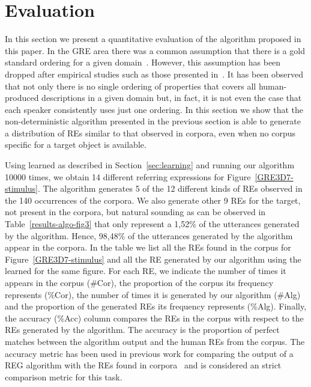 \section{Evaluation}\label{sec:evaluation}

In this section we present a quantitative evaluation of the algorithm proposed in this paper. In the GRE area there was a common assumption that there is a gold standard ordering for a given domain~\cite{Dale1995}. However, this assumption has been dropped after empirical studies such as those presented in~\cite{arec2:2008:Areces,viet:gene11}. It has been observed that not only there is no single ordering of properties that covers all human-produced descriptions in a given domain but, in fact, it is not even the case that each speaker consistently uses just one ordering. In this section we show that the non-deterministic algorithm presented in the previous section is able to generate a distribution of REs similar to that observed in corpora, even when no corpus specific for a target object is available. 

Using \puse learned as described in Section~\ref{sec:learning} and running our algorithm 10000 times, we obtain 14 different referring expressions for Figure~\ref{GRE3D7-stimulus}. The algorithm generates 5 of the 12 different kinds of REs observed in the 140 occurrences of the corpora. We also generate other 9 REs for the target, not present in the corpora, but natural sounding as can be observed in Table~\ref{results-algo-fig3} that only represent a 1,52\% of the utterances generated by the algorithm. Hence, 98,48\% of the utterances generated by the algorithm appear in the corpora. In the table we list all the REs found in the corpus for Figure~\ref{GRE3D7-stimulus} and all the RE generated by our algorithm using the learned \puse for the same figure. For each RE, we indicate the number of times it appears in the corpus (\#Cor), the proportion of the corpus its frequency represents (\%Cor), the number of times it is generated by our algorithm (\#Alg) and the proportion of the generated REs its frequency represents (\%Alg). Finally, the accuracy (\%Acc) column compares the REs in the corpus with respect to the REs generated by the algorithm. The accuracy is the proportion of perfect matches between the algorithm output and the human REs from the corpus. The accuracy metric has been used in previous work for comparing the output of a REG algorithm with the REs found in corpora~\cite{sluis07:eval,viet:gene11} and is considered an strict comparison metric for this task. 


